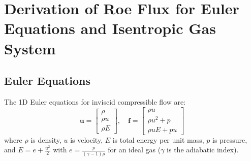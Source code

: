 \documentclass[12pt]{article}
\begin{document}
\section*{Derivation of Roe Flux for Euler Equations and Isentropic Gas System}

\subsection*{Euler Equations}
The 1D Euler equations for inviscid compressible flow are:
\[
\mathbf{u} = \begin{bmatrix} \rho \\ \rho u \\ \rho E \end{bmatrix}, \quad \mathbf{f} = \begin{bmatrix} \rho u \\ \rho u^2 + p \\ \rho u E + p u \end{bmatrix}
\]
where \(\rho\) is density, \(u\) is velocity, \(E\) is total energy per unit mass, \(p\) is pressure, and \(E = e + \frac{u^2}{2}\) with \(e = \frac{p}{(\gamma-1)\rho}\) for an ideal gas (\(\gamma\) is the adiabatic index).
\end{document}
